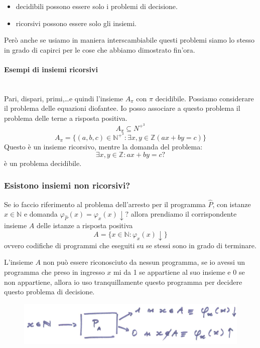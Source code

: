 \documentclass{article}
\begin{document}
\begin{itemize}
    \item decidibili possono essere solo i problemi di decisione.
    \item ricorsivi possono essere solo gli insiemi.
\end{itemize}
Però anche se usiamo in maniera interscambiabile questi problemi siamo lo stesso
in grado di capirci per le cose che abbiamo dimostrato fin'ora.


\paragraph{Esempi di insiemi ricorsivi}\mbox{}\\
Pari, dispari, primi,\dots e quindi l'insieme $A_\pi$ con $\pi$ decidibile.
Possiamo considerare il problema delle equazioni diofantee. Io posso associare
a questo problema il problema delle terne a risposta positiva.
$$A_\pi\subseteq N^{+^3}$$
$$A_\pi=\{(a,b,c)\in\mathbb{N}^{+^3}:\exists x,y\in\mathbb{Z}(ax+by=c)\}$$
Questo è un insieme ricorsivo, mentre la domanda del problema:
$$\exists x,y\in\mathbb{Z}:ax+by=c?$$
è un problema decidibile.

\subsubsection{Esistono insiemi non ricorsivi?}
Se io faccio riferimento al problema dell'arresto per il programma $\hat{P}$, con
istanze $x\in\mathbb{N}$ e domanda $\varphi_{\hat{P}}(x)=\varphi_x(x)\downarrow?$
allora prendiamo il corrispondente insieme $A$ delle istanze a risposta positiva
$$A=\{x\in\mathbb{N}:\varphi_x(x)\downarrow\}$$
ovvero codifiche di programmi che eseguiti su se stessi sono in grado di terminare.

L'insieme $A$ non può essere riconosciuto da nessun programma, se io avessi un programma
che preso in ingresso $x$ mi da 1 se appartiene al suo insieme e 0 se non appartiene,
allora io uso tranquillamente questo programma per decidere questo problema di decisione.
\begin{figure}[H]
    \centering
    \includegraphics[scale=0.5]{images/a_non_ric.png}
\end{figure}
\end{document}
